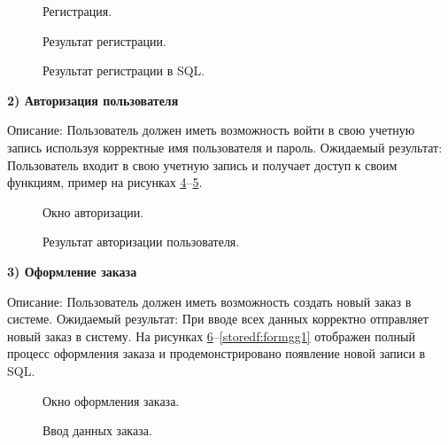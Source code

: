 \begin{figure}[ht]
	\caption{Регистрация.}
	\label{storedf:loginus}
\end{figure}

\begin{figure}[ht]
	\caption{Результат регистрации.}
	\label{storedf:loginc}
\end{figure}

\begin{figure}[ht]
	\caption{Результат регистрации в SQL.}
	\label{storedf:login1}
\end{figure}


\clearpage 

\textbf{2) Авторизация пользователя}

Описание: Пользователь должен иметь возможность войти в свою учетную запись используя корректные имя пользователя и пароль.
Ожидаемый результат: Пользователь входит в свою учетную запись и получает доступ к своим функциям, пример на рисунках \ref{storedf:loginad}--\ref{storedf:panel0}.

\begin{figure}[ht]
	\caption{Окно авторизации.}
	\label{storedf:loginad}
\end{figure}

\begin{figure}[ht]
	\caption{Результат авторизации пользователя.}
	\label{storedf:panel0}
\end{figure}

\textbf{3) Оформление заказа}

Описание: Пользователь должен иметь возможность создать новый заказ в системе.
Ожидаемый результат:  При вводе всех данных корректно отправляет новый заказ в систему.
На рисунках \ref{storedf:form0}--\ref{storedf:formgg1} отображен полный процесс оформления заказа и продемонстрировано появление новой записи в SQL.
\begin{figure}[ht]
	\caption{Окно оформления заказа.}
	\label{storedf:form0}
\end{figure}

\begin{figure}[ht]
	\caption{Ввод данных заказа.}
	\label{storedf:form1}
\end{figure}


